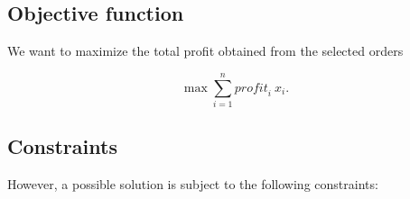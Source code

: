 \documentclass{article}
\begin{document}
\subsection{Objective function}

We want to maximize the total profit obtained from the selected orders

\begin{equation*}
  \max \sum^n_{i = 1} \mathit{profit}_i \: x_i.
\end{equation*}

\subsection{Constraints}

However, a possible solution is subject to the following constraints:
\end{document}
